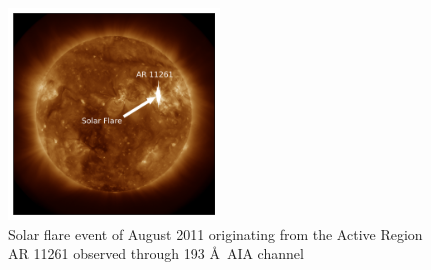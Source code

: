 \begin{figure}
    \centering
    \includegraphics[width=0.5\textwidth]{images/solar_flare_4_aug_2011.png}
    \caption[Solar flare ( August 2011)]{Solar flare event of  August 2011 originating from the Active Region AR 11261 observed through 193 \AA \ AIA channel}
    \label{fig:solar_flare_4_aug_2011}
\end{figure}

